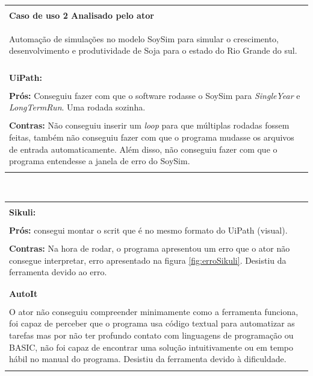 \documentclass[tg]{mdtufsm}
\begin{document}
            	{\centering
                    \begin{tabular}{ | m{15.6cm} | }
                		\hline \\
                		{\bf Caso de uso 2 Analisado pelo ator} \\
                		\begin{center}
                            Automação de simulações no modelo SoySim para simular o crescimento, desenvolvimento e produtividade de Soja para o estado do Rio Grande do sul.
                        \end{center}
                		\\ \hline \hline \\
            	        {\bf UiPath:} \\ \\
                		{\bf Prós:}
                            Conseguiu fazer com que o software rodasse o SoySim para \emph{SingleYear} e  \emph{LongTermRun}. Uma rodada sozinha. \\ \\
                		{\bf Contras:}
                            Não conseguiu inserir um \emph{loop} para que múltiplas rodadas fossem feitas, também não conseguiu fazer com que o programa mudasse os arquivos de entrada automaticamente. Além disso, não conseguiu fazer com que o programa entendesse a janela de erro do SoySim. \\ \\
            		    \hline
                    \end{tabular} \\

                    \begin{tabular}{ | m{15.6cm} | }
                        \hline \\
                		{\bf Sikuli:} \\ \\
                		{\bf Prós:}
                            consegui montar o scrit que é no mesmo formato do UiPath (visual).  \\ \\
                		{\bf Contras:}
                            Na hora de rodar, o programa apresentou um erro que o ator não consegue interpretar, erro apresentado na figura \ref{fig:erroSikuli}. Desistiu da ferramenta devido ao erro. \\ \\
                		\hline \hline \\
                		{\bf AutoIt} \\ \\
                            O ator não conseguiu compreender minimamente como a ferramenta funciona, foi capaz de perceber que o programa usa código textual para automatizar as tarefas mas por não ter profundo contato com linguagens de programação ou BASIC, não foi capaz de encontrar uma solução intuitivamente ou em tempo hábil no manual do programa. Desistiu da ferramenta devido à dificuldade. \\ \\
            	       \hline
            	   \end{tabular}
                }
\end{document}
